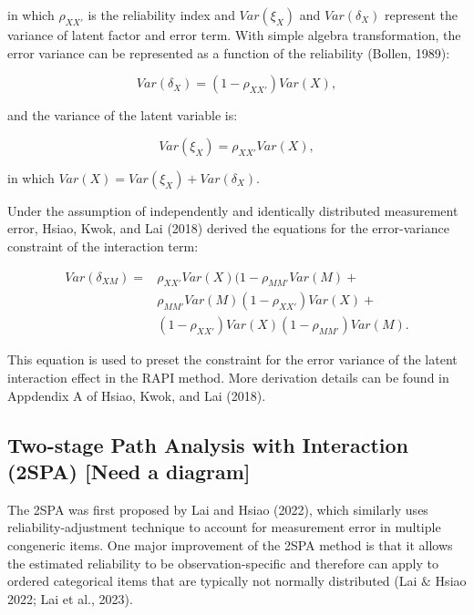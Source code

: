 \documentclass[
  man]{apa7}
\begin{document}
in which \(\rho_{XX'}\) is the reliability index and \(Var(\xi_{X})\) and \(Var(\delta_{X})\) represent the variance of latent factor and error term. With simple algebra transformation, the error variance can be represented as a function of the reliability (Bollen, 1989):

\begin{equation}
Var(\delta_{X}) = (1 - \rho_{XX'})Var(X),
\end{equation}

and the variance of the latent variable is:

\begin{equation}
Var(\xi_{X}) = \rho_{XX'}Var(X),
\end{equation}

in which \(Var(X) = Var(\xi_{X}) + Var(\delta_{X})\).

Under the assumption of independently and identically distributed measurement error, Hsiao, Kwok, and Lai (2018) derived the equations for the error-variance constraint of the interaction term:

\begin{equation}
\begin{aligned}
   Var(\delta_{XM}) = & \rho_{XX'}Var(X)(1 - \rho_{MM'}Var(M) + \\&
                        \rho_{MM'}Var(M)(1-\rho_{XX'})Var(X) + \\&
                        (1 - \rho_{XX'})Var(X)(1 - \rho_{MM'})Var(M).
\end{aligned}
\end{equation}

This equation is used to preset the constraint for the error variance of the latent interaction effect in the RAPI method. More derivation details can be found in Appdendix A of Hsiao, Kwok, and Lai (2018).

\hypertarget{two-stage-path-analysis-with-interaction-2spa-need-a-diagram}{%
\subsection{Two-stage Path Analysis with Interaction (2SPA) {[}Need a diagram{]}}\label{two-stage-path-analysis-with-interaction-2spa-need-a-diagram}}

The 2SPA was first proposed by Lai and Hsiao (2022), which similarly uses reliability-adjustment technique to account for measurement error in multiple congeneric items. One major improvement of the 2SPA method is that it allows the estimated reliability to be observation-specific and therefore can apply to ordered categorical items that are typically not normally distributed (Lai \(\&\) Hsiao 2022; Lai et al., 2023).
\end{document}
